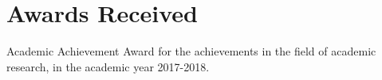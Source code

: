\documentclass[master]{thesis-uestc}
\begin{document}

\printglossary


\section*{\textbf{Awards Received}}
Academic Achievement Award for the achievements in the field of academic research, in the academic year 2017-2018.





\end{document}
